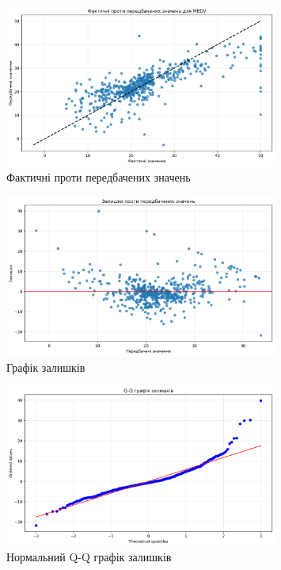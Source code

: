 \documentclass{article}
\begin{document}
    \begin{figure}[H]
        \centering
        \includegraphics[width=0.8\textwidth]{actual_vs_predicted.png}
        \caption{Фактичні проти передбачених значень}
        \label{fig:фактичні_проти_передбачених_значень}
    \end{figure}

    \vspace{0.5cm}
    
    \begin{figure}[H]
        \centering
        \includegraphics[width=0.8\textwidth]{residuals.png}
        \caption{Графік залишків}
        \label{fig:графік_залишків}
    \end{figure}

    \vspace{0.5cm}
    
    \begin{figure}[H]
        \centering
        \includegraphics[width=0.8\textwidth]{qq_plot.png}
        \caption{Нормальний Q-Q графік залишків}
        \label{fig:нормальний_q-q_графік_залишків}
    \end{figure}
\end{document}
